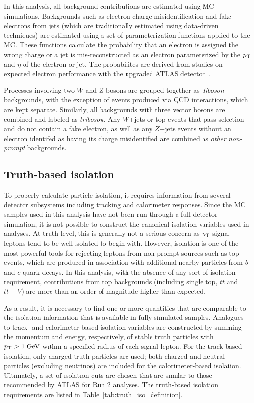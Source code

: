 In this analysis, all background contributions are estimated using MC simulations.
Backgrounds such as electron charge misidentification and fake electrons from jets (which are traditionally estimated using data-driven techniques) are estimated using a set of parameterization functions applied to the MC.
These functions calculate the probability that an electron is assigned the wrong charge or a jet is mis-reconstructed as an electron parameterized by the $p_{\mathrm{T}}$ and $\eta$ of the electron or jet.
The probabilites are derived from studies on expected electron performance with the upgraded ATLAS detector~\cite{2016.upgrade-electron-performance}.

Processes involving two $W$ and $Z$ bosons are grouped together as \emph{diboson} backgrounds, with the exception of \ssww events produced via QCD interactions, which are kept separate.
Similarly, all backgrounds with three vector bosons are combined and labeled as \emph{triboson}.
Any $W$+jets or top events that pass selection and do not contain a fake electron, as well as any $Z$+jets events without an electron identifed as having its charge misidentified are combined as \emph{other non-prompt} backgrounds.

\subsection{Truth-based isolation}\label{sswwupgrade:isolation}
To properly calculate particle isolation, it requires information from several detector subsystems including tracking and calorimeter responses.
Since the MC samples used in this analysis have not been run through a full detector simulation, it is not possible to construct the canonical isolation variables used in analyses.
At truth-level, this is generally not a serious concern as $p_{\mathrm{T}}$ signal leptons tend to be well isolated to begin with.
However, isolation is one of the most powerful tools for rejecting leptons from non-prompt sources such as top events, which are produced in association with additional nearby particles from $b$ and $c$ quark decays.
In this analysis, with the absence of any sort of isolation requirement, contributions from top backgrounds (including single top, $t\bar{t}$ and $t\bar{t}+V$) are more than an order of magnitude higher than expected.%

As a result, it is necessary to find one or more quantities that are comparable to the isolation information that is available in fully-simulated samples.
Analogues to track- and calorimeter-based isolation variables are constructed by summing the momentum and energy, respectively, of stable truth particles with $\pt > 1\gev$ within a specified radius of each signal lepton.
For the track-based isolation, only charged truth particles are used; both charged and neutral particles (excluding neutrinos) are included for the calorimeter-based isolation.
Ultimately, a set of isolation cuts are chosen that are similar to those recommended by ATLAS for Run 2 analyses.
The truth-based isolation requirements are listed in Table~\ref{tab:truth_iso_definition}.

